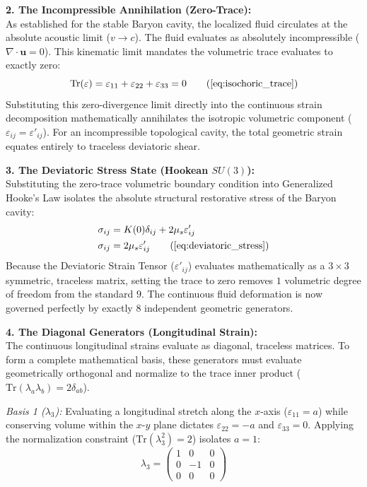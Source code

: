 \documentclass[11pt, a4paper]{article}
\begin{document}
\textbf{2. The Incompressible Annihilation (Zero-Trace):} \\
As established for the stable Baryon cavity, the localized fluid circulates at the absolute acoustic limit ($v \to c$). The fluid evaluates as absolutely incompressible ($\nabla \cdot \mathbf{u} = 0$). This kinematic limit mandates the volumetric trace evaluates to exactly zero:
\begin{equation}
    \text{Tr}(\varepsilon) = \varepsilon_{11} + \varepsilon_{22} + \varepsilon_{33} = 0 \tag{\ref{eq:isochoric_trace}}
\end{equation}
Substituting this zero-divergence limit directly into the continuous strain decomposition mathematically annihilates the isotropic volumetric component ($\varepsilon_{ij} = \varepsilon'_{ij}$). For an incompressible topological cavity, the total geometric strain equates entirely to traceless deviatoric shear.

\textbf{3. The Deviatoric Stress State (Hookean $SU(3)$):} \\
Substituting the zero-trace volumetric boundary condition into Generalized Hooke's Law isolates the absolute structural restorative stress of the Baryon cavity:
\begin{align}
    \sigma_{ij} &= K(0)\delta_{ij} + 2\mu_s \varepsilon'_{ij}  \\
    \sigma_{ij} &= 2\mu_s \varepsilon'_{ij} \tag{\ref{eq:deviatoric_stress}}
\end{align}
Because the Deviatoric Strain Tensor ($\varepsilon'_{ij}$) evaluates mathematically as a $3 \times 3$ symmetric, traceless matrix, setting the trace to zero removes $1$ volumetric degree of freedom from the standard $9$. The continuous fluid deformation is now governed perfectly by exactly $8$ independent geometric generators.

\textbf{4. The Diagonal Generators (Longitudinal Strain):} \\
The continuous longitudinal strains evaluate as diagonal, traceless matrices. To form a complete mathematical basis, these generators must evaluate geometrically orthogonal and normalize to the trace inner product ($\text{Tr}(\lambda_a \lambda_b) = 2\delta_{ab}$).

\textit{Basis 1 ($\lambda_3$):} 
Evaluating a longitudinal stretch along the $x$-axis ($\varepsilon_{11} = a$) while conserving volume within the $x$-$y$ plane dictates $\varepsilon_{22} = -a$ and $\varepsilon_{33} = 0$. Applying the normalization constraint ($\text{Tr}(\lambda_3^2) = 2$) isolates $a = 1$:
\begin{equation}
    \lambda_3 = \begin{pmatrix} 1 & 0 & 0 \\ 0 & -1 & 0 \\ 0 & 0 & 0 \end{pmatrix} 
\end{equation}
\end{document}
